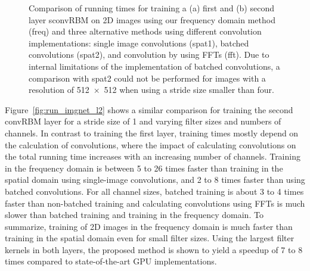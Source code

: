 \begin{figure}[t!]


\label{fig:run_imgnet}
\caption[Comparison of running times for training a sconvRBMs on 2D
images]{Comparison of running times for training a (a) first and (b) second
layer sconvRBM on 2D images using our frequency domain method (freq) and three
alternative methods using different convolution implementations: single image
convolutions (spat1), batched convolutions (spat2), and convolution by using
FFTs (fft). Due to internal limitations of the implementation of batched
convolutions, a comparison with spat2 could not be performed for images with a
resolution of \num{512x512} when using a stride size smaller than four.}
\end{figure}

Figure~\ref{fig:run_imgnet_l2} shows a similar comparison for training the
second convRBM layer for a stride size of 1 and varying filter sizes and numbers
of channels. In contrast to training the first layer, training times mostly
depend on the calculation of convolutions, where the impact of calculating
convolutions on the total running time increases with an increasing number of
channels. Training in the frequency domain is between 5 to 26 times faster than
training in the spatial domain using single-image convolutions, and 2
to 8 times faster than using batched convolutions. For all channel sizes,
batched training is about 3 to 4 times faster than non-batched training and
calculating convolutions using FFTs is much slower than batched training and
training in the frequency domain. To summarize, training of 2D images in the
frequency domain is much faster than training in the spatial domain even for
small filter sizes.
Using the largest filter kernels in both layers, the proposed method is shown to
yield a speedup of 7 to 8 times compared to state-of-the-art GPU
implementations.

